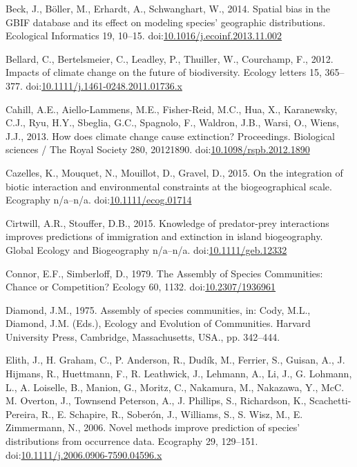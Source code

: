 \hypertarget{ref-Beck2014a}{}
Beck, J., Böller, M., Erhardt, A., Schwanghart, W., 2014. Spatial bias
in the GBIF database and its effect on modeling species' geographic
distributions. Ecological Informatics 19, 10--15.
doi:\href{https://doi.org/10.1016/j.ecoinf.2013.11.002}{10.1016/j.ecoinf.2013.11.002}

\hypertarget{ref-Bellard2012}{}
Bellard, C., Bertelsmeier, C., Leadley, P., Thuiller, W., Courchamp, F.,
2012. Impacts of climate change on the future of biodiversity. Ecology
letters 15, 365--377.
doi:\href{https://doi.org/10.1111/j.1461-0248.2011.01736.x}{10.1111/j.1461-0248.2011.01736.x}

\hypertarget{ref-Cahill2013}{}
Cahill, A.E., Aiello-Lammens, M.E., Fisher-Reid, M.C., Hua, X.,
Karanewsky, C.J., Ryu, H.Y., Sbeglia, G.C., Spagnolo, F., Waldron, J.B.,
Warsi, O., Wiens, J.J., 2013. How does climate change cause extinction?
Proceedings. Biological sciences / The Royal Society 280, 20121890.
doi:\href{https://doi.org/10.1098/rspb.2012.1890}{10.1098/rspb.2012.1890}

\hypertarget{ref-Cazelles2015b}{}
Cazelles, K., Mouquet, N., Mouillot, D., Gravel, D., 2015. On the
integration of biotic interaction and environmental constraints at the
biogeographical scale. Ecography n/a--n/a.
doi:\href{https://doi.org/10.1111/ecog.01714}{10.1111/ecog.01714}

\hypertarget{ref-Cirtwill2015}{}
Cirtwill, A.R., Stouffer, D.B., 2015. Knowledge of predator-prey
interactions improves predictions of immigration and extinction in
island biogeography. Global Ecology and Biogeography n/a--n/a.
doi:\href{https://doi.org/10.1111/geb.12332}{10.1111/geb.12332}

\hypertarget{ref-Connor1979}{}
Connor, E.F., Simberloff, D., 1979. The Assembly of Species Communities:
Chance or Competition? Ecology 60, 1132.
doi:\href{https://doi.org/10.2307/1936961}{10.2307/1936961}

\hypertarget{ref-Diamond1975}{}
Diamond, J.M., 1975. Assembly of species communities, in: Cody, M.L.,
Diamond, J.M. (Eds.), Ecology and Evolution of Communities. Harvard
University Press, Cambridge, Massachusetts, USA., pp. 342--444.

\hypertarget{ref-Elith2006}{}
Elith, J., H. Graham, C., P. Anderson, R., Dudík, M., Ferrier, S.,
Guisan, A., J. Hijmans, R., Huettmann, F., R. Leathwick, J., Lehmann,
A., Li, J., G. Lohmann, L., A. Loiselle, B., Manion, G., Moritz, C.,
Nakamura, M., Nakazawa, Y., McC. M. Overton, J., Townsend Peterson, A.,
J. Phillips, S., Richardson, K., Scachetti-Pereira, R., E. Schapire, R.,
Soberón, J., Williams, S., S. Wisz, M., E. Zimmermann, N., 2006. Novel
methods improve prediction of species' distributions from occurrence
data. Ecography 29, 129--151.
doi:\href{https://doi.org/10.1111/j.2006.0906-7590.04596.x}{10.1111/j.2006.0906-7590.04596.x}

